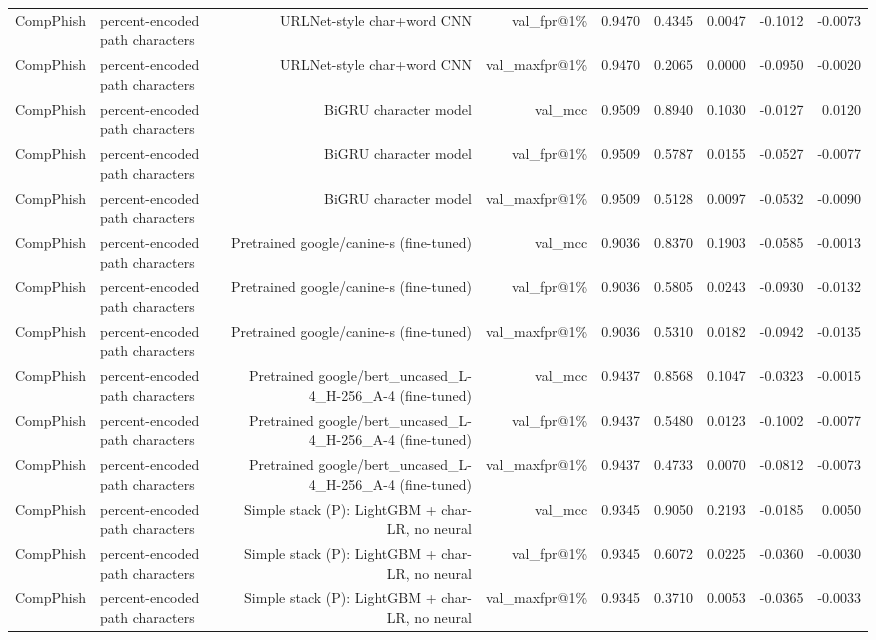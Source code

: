 \begin{table}[t]
\begin{tabular}{llrrrrrrr}
CompPhish & percent-encoded path characters & URLNet-style char+word CNN & val\_fpr@1\% & 0.9470 & 0.4345 & 0.0047 & -0.1012 & -0.0073 \\
CompPhish & percent-encoded path characters & URLNet-style char+word CNN & val\_maxfpr@1\% & 0.9470 & 0.2065 & 0.0000 & -0.0950 & -0.0020 \\
CompPhish & percent-encoded path characters & BiGRU character model & val\_mcc & 0.9509 & 0.8940 & 0.1030 & -0.0127 & 0.0120 \\
CompPhish & percent-encoded path characters & BiGRU character model & val\_fpr@1\% & 0.9509 & 0.5787 & 0.0155 & -0.0527 & -0.0077 \\
CompPhish & percent-encoded path characters & BiGRU character model & val\_maxfpr@1\% & 0.9509 & 0.5128 & 0.0097 & -0.0532 & -0.0090 \\
CompPhish & percent-encoded path characters & Pretrained google/canine-s (fine-tuned) & val\_mcc & 0.9036 & 0.8370 & 0.1903 & -0.0585 & -0.0013 \\
CompPhish & percent-encoded path characters & Pretrained google/canine-s (fine-tuned) & val\_fpr@1\% & 0.9036 & 0.5805 & 0.0243 & -0.0930 & -0.0132 \\
CompPhish & percent-encoded path characters & Pretrained google/canine-s (fine-tuned) & val\_maxfpr@1\% & 0.9036 & 0.5310 & 0.0182 & -0.0942 & -0.0135 \\
CompPhish & percent-encoded path characters & Pretrained google/bert\_uncased\_L-4\_H-256\_A-4 (fine-tuned) & val\_mcc & 0.9437 & 0.8568 & 0.1047 & -0.0323 & -0.0015 \\
CompPhish & percent-encoded path characters & Pretrained google/bert\_uncased\_L-4\_H-256\_A-4 (fine-tuned) & val\_fpr@1\% & 0.9437 & 0.5480 & 0.0123 & -0.1002 & -0.0077 \\
CompPhish & percent-encoded path characters & Pretrained google/bert\_uncased\_L-4\_H-256\_A-4 (fine-tuned) & val\_maxfpr@1\% & 0.9437 & 0.4733 & 0.0070 & -0.0812 & -0.0073 \\
CompPhish & percent-encoded path characters & Simple stack (P): LightGBM + char-LR, no neural & val\_mcc & 0.9345 & 0.9050 & 0.2193 & -0.0185 & 0.0050 \\
CompPhish & percent-encoded path characters & Simple stack (P): LightGBM + char-LR, no neural & val\_fpr@1\% & 0.9345 & 0.6072 & 0.0225 & -0.0360 & -0.0030 \\
CompPhish & percent-encoded path characters & Simple stack (P): LightGBM + char-LR, no neural & val\_maxfpr@1\% & 0.9345 & 0.3710 & 0.0053 & -0.0365 & -0.0033 \\

\end{tabular}
\end{table}
